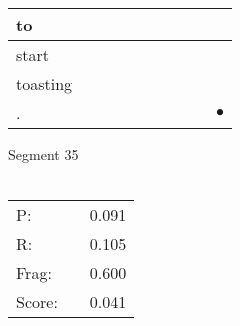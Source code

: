 \documentclass[landscape]{article}
\newcommand{\ssp}{\hspace{2pt}}
\newcommand{\mex}{\cellcolor{g}$\bullet$}
\begin{document}
\begin{tabular}{|l|p{10pt}|p{10pt}|p{10pt}|p{10pt}|p{10pt}|p{10pt}|p{10pt}|p{10pt}|p{10pt}|}
\hline
\ssp to \ssp&\hspace{2pt}&\hspace{2pt}&\hspace{2pt}&\hspace{2pt}&\hspace{2pt}&\hspace{2pt}&\hspace{2pt}&\hspace{2pt}&\hspace{2pt}\\
\hline
\ssp start \ssp&\hspace{2pt}&\hspace{2pt}&\hspace{2pt}&\hspace{2pt}&\hspace{2pt}&\hspace{2pt}&\hspace{2pt}&\hspace{2pt}&\hspace{2pt}\\
\hline
\ssp toasting \ssp&\hspace{2pt}&\hspace{2pt}&\hspace{2pt}&\hspace{2pt}&\hspace{2pt}&\hspace{2pt}&\hspace{2pt}&\hspace{2pt}&\hspace{2pt}\\
\hline
\ssp \cellcolor{ref8}. \ssp&\hspace{2pt}&\hspace{2pt}&\hspace{2pt}&\hspace{2pt}&\hspace{2pt}&\hspace{2pt}&\hspace{2pt}&\hspace{2pt}&\hspace{2pt}\mex\\
\hline
\end{tabular}

\vspace{6pt}
\noindent Segment 35\\\\
\noindent\begin{tabular}{lm{12pt}r}
\hline
P:&&0.091\\
R:&&0.105\\
Frag:&&0.600\\
Score:&&0.041\\
\end{tabular}
\end{document}

